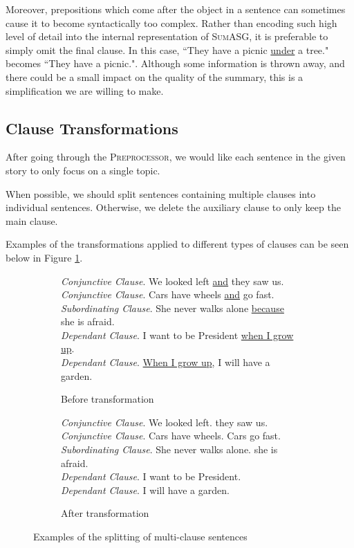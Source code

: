 Moreover, prepositions which come after the object in a sentence can sometimes cause it to become syntactically too complex. Rather than encoding such high level of detail into the internal representation of \textsc{SumASG}, it is preferable to simply omit the final clause. In this case, ``They have a picnic \underline{under} a tree." becomes ``They have a picnic.". Although some information is thrown away, and there could be a small impact on the quality of the summary, this is a simplification we are willing to make.

\subsection{Clause Transformations}

After going through the \textsc{Preprocessor}, we would like each sentence in the given story to only focus on a single topic.

When possible, we should split sentences containing multiple clauses into individual sentences. Otherwise, we delete the auxiliary clause to only keep the main clause.

Examples of the transformations applied to different types of clauses can be seen below in Figure \ref{fig:clause_transformations}.

\begin{figure}[H]
\begin{subfigure}{\textwidth}
\begin{displayquote}
\textit{Conjunctive Clause}. We looked left \underline{and} they saw us.\\
\textit{Conjunctive Clause}. Cars have wheels \underline{and} go fast.\\
\textit{Subordinating Clause}. She never walks alone \underline{because} she is afraid.\\
\textit{Dependant Clause}. I want to be President \underline{when I grow up}.\\
\textit{Dependant Clause}. \underline{When I grow up}, I will have a garden.
\end{displayquote}
\caption{Before transformation}
\vspace{\baselineskip}
\end{subfigure}
\begin{subfigure}{\textwidth}
\begin{displayquote}
\textit{Conjunctive Clause}. We looked left. they saw us.\\
\textit{Conjunctive Clause}. Cars have wheels. Cars go fast.\\
\textit{Subordinating Clause}. She never walks alone. she is afraid.\\
\textit{Dependant Clause}. I want to be President.\\
\textit{Dependant Clause}. I will have a garden.
\end{displayquote}
\caption{After transformation}
\end{subfigure}
\caption{Examples of the splitting of multi-clause sentences}
\label{fig:clause_transformations}
\end{figure}

